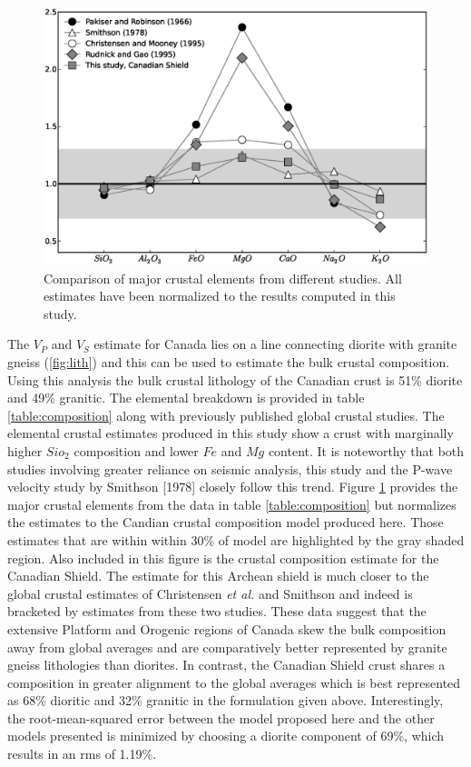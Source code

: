 \documentclass[draft, 12pt]{article}
\begin{document}
\begin{figure}
  \centering
  \includegraphics[width=\textwidth]{composition}
  \caption{Comparison of major crustal elements from different studies. All estimates have been normalized to the results computed in this study.}
  \label{fig:composition}
\end{figure}

The $V_P$ and $V_S$ estimate for Canada lies on a line connecting diorite with granite gneiss (\ref{fig:lith}) and this can be used to estimate the bulk crustal composition. Using this analysis the bulk crustal lithology of the Canadian crust is 51\% diorite and 49\% granitic. The elemental breakdown is provided in table \ref{table:composition} along with previously published global crustal studies. The elemental crustal estimates produced in this study show a crust with marginally higher $Sio_2$ composition and lower $Fe$ and $Mg$ content. It is noteworthy that both studies involving greater reliance on seismic analysis, this study and the P-wave velocity study by Smithson [1978] closely follow this trend. Figure \ref{fig:composition} provides the major crustal elements from the data in table \ref{table:composition} but normalizes the estimates to the Candian crustal composition model produced here. Those estimates that are within within 30\% of model are highlighted by the gray shaded region. Also included in this figure is the crustal composition estimate for the Canadian Shield. The estimate for this Archean shield is much closer to the global crustal estimates of Christensen {\it et al.} and Smithson and indeed is bracketed by estimates from these two studies. These data suggest that the extensive Platform and Orogenic regions of Canada skew the bulk composition away from global averages and are comparatively better represented by granite gneiss lithologies than diorites. In contrast, the Canadian Shield crust shares a composition in greater alignment to the global averages which is best represented as 68\% dioritic and 32\% granitic in the formulation given above. Interestingly, the root-mean-squared error between the model proposed here and the other models presented is minimized by choosing a diorite component of 69\%, which results in an rms of 1.19\%.
\end{document}
